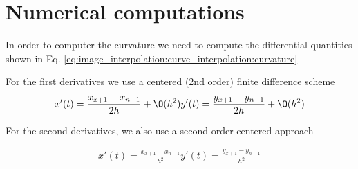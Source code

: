 \appendix
\section{Numerical computations}

In order to computer the curvature we need to compute the differential quantities shown in Eq. \ref{eq:image_interpolation:curve_interpolation:curvature} 

For the first derivatives we use a centered (2nd order) finite difference scheme
\begin{eqnarray}
	x'(t)=\frac{x_{x+1}-x_{n-1}}{2h}+\O(h^2)
	y'(t)=\frac{y_{x+1}-y_{n-1}}{2h}+\O(h^2)
\end{eqnarray}

For the second derivatives, we also use a second order centered approach

\begin{eqnarray}
	x'(t)=\frac{x_{x+1}-x_{n-1}}{h^2}
	y'(t)=\frac{y_{x+1}-y_{n-1}}{h^2}
\end{eqnarray}